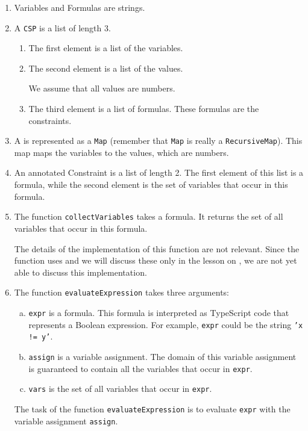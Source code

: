 \begin{enumerate}
\item Variables and Formulas are strings.  
\item A \texttt{CSP} is a list of length 3.
  \begin{enumerate}
  \item The first element is a list of the variables.  
  \item The second element is a list of the values.

        We assume that all values are numbers.
  \item The third element is a list of formulas.
        These formulas are the constraints.
  \end{enumerate}
\item A  is represented as a \texttt{Map} (remember that \texttt{Map} is really a
      \texttt{RecursiveMap}).  This map maps the variables to the values, which are numbers.
\item An annotated Constraint is a list of length 2.  The first element of this list is a formula, while the
      second element is the set of variables that occur in this formula.
\item The function \texttt{collectVariables} takes a formula.  It returns the
      set of all variables that occur in this formula.

      The details of the implementation of this function are not relevant.  Since the function uses
       and we will discuss these only in the lesson on ,
      we are not yet able to discuss this implementation.
\item The function \texttt{evaluateExpression} takes three arguments:
  \begin{enumerate}[(a)]
  \item \texttt{expr} is a formula.  This formula is interpreted as TypeScript code that represents a Boolean
        expression.  For example, \texttt{expr} could be the string \texttt{'x != y'}.
  \item \texttt{assign} is a variable assignment.  The domain of this variable assignment is guaranteed to
        contain all the variables that occur in \texttt{expr}.    
  \item \texttt{vars} is the set of all variables that occur in \texttt{expr}.
  \end{enumerate}
  The task of the function \texttt{evaluateExpression} is to evaluate \texttt{expr} with the variable
  assignment \texttt{assign}.


\end{enumerate}
